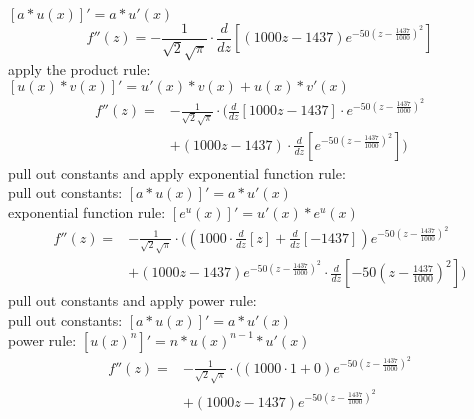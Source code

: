 \documentclass[12pt]{article}
\begin{document}
\begin{enumerate}[i.]
    $[a*u(x)]' = a*u'(x)$
    \begin{equation}
        f''(z) = - \frac{1}{\sqrt{2}\sqrt{\pi}} \cdot \frac{d}{dz} \left [(1000z - 1437)e^{-50 \left (z-\frac{1437}{1000} \right )^2} \right ]
    \end{equation}
    apply the product rule: \\
    $[u(x)*v(x)]' = u'(x)*v(x) + u(x)*v'(x)$
    \begin{equation}
        \begin{aligned}
            f''(z) = {}
            & - \frac{1}{\sqrt{2}\sqrt{\pi}} \cdot (\frac{d}{dz} \left [1000z - 1437 \right ] \cdot e^{-50 \left (z-\frac{1437}{1000} \right )^2} \\
            & + (1000z - 1437) \cdot \frac{d}{dz} \left [e^{-50 \left (z-\frac{1437}{1000} \right )^2} \right ] )
        \end{aligned}
    \end{equation}
    pull out constants and apply exponential function rule: \\
    pull out constants: $[a*u(x)]' = a*u'(x)$ \\
    exponential function rule: $[e^u(x)]' = u'(x) * e^u(x)$ \\
    \begin{equation}
        \begin{aligned}
            f''(z) = {}
            & - \frac{1}{\sqrt{2}\sqrt{\pi}} \cdot ((1000 \cdot \frac{d}{dz} \left [z \right ] + \frac{d}{dz} \left [-1437 \right ])e^{-50 \left (z-\frac{1437}{1000} \right )^2} \\
            & + (1000z - 1437)e^{-50 \left (z-\frac{1437}{1000} \right )^2} \cdot \frac{d}{dz} \left [-50 \left (z-\frac{1437}{1000} \right )^2 \right ] )
        \end{aligned}
    \end{equation}
    pull out constants and apply power rule: \\
    pull out constants: $[a*u(x)]' = a*u'(x)$ \\
    power rule: $[u(x)^n]' = n*u(x)^{n-1} * u'(x)$ \\
    \begin{equation}
        \begin{aligned}
            f''(z) = {}
            & - \frac{1}{\sqrt{2}\sqrt{\pi}} \cdot ((1000 \cdot 1 + 0)e^{-50 \left (z-\frac{1437}{1000} \right )^2} \\
            & + (1000z - 1437)e^{-50 \left (z-\frac{1437}{1000} \right )^2} \\

\end{aligned}
\end{equation}
\end{enumerate}
\end{document}
